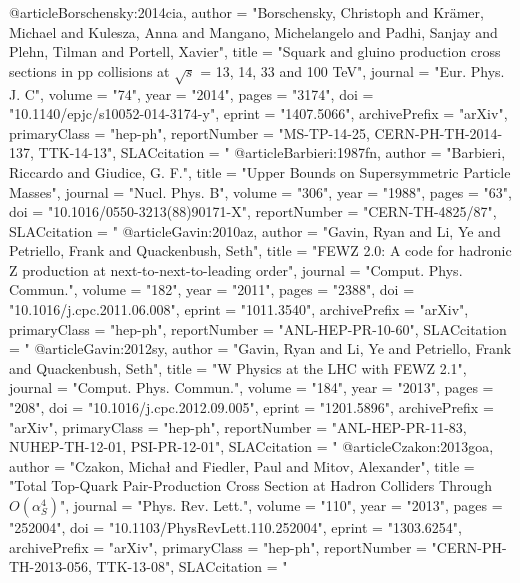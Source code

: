 @article{Borschensky:2014cia,
      author         = "Borschensky, Christoph and Kr{\"a}mer, Michael and Kulesza,
                        Anna and Mangano, Michelangelo and Padhi, Sanjay and
                        Plehn, Tilman and Portell, Xavier",
      title          = "{Squark and gluino production cross sections in pp
                        collisions at $\sqrt{s}$ = 13, 14, 33 and 100 TeV}",
      journal        = "Eur. Phys. J. C",
      volume         = "74",
      year           = "2014",
      pages          = "3174",
      doi            = "10.1140/epjc/s10052-014-3174-y",
      eprint         = "1407.5066",
      archivePrefix  = "arXiv",
      primaryClass   = "hep-ph",
      reportNumber   = "MS-TP-14-25, CERN-PH-TH-2014-137, TTK-14-13",
      SLACcitation   = "%
}
@article{Barbieri:1987fn,
      author         = "Barbieri, Riccardo and Giudice, G. F.",
      title          = "{Upper Bounds on Supersymmetric Particle Masses}",
      journal        = "Nucl. Phys. B",
      volume         = "306",
      year           = "1988",
      pages          = "63",
      doi            = "10.1016/0550-3213(88)90171-X",
      reportNumber   = "CERN-TH-4825/87",
      SLACcitation   = "%
}
@article{Gavin:2010az,
      author         = "Gavin, Ryan and Li, Ye and Petriello, Frank and
                        Quackenbush, Seth",
      title          = "{FEWZ 2.0: A code for hadronic Z production at
                        next-to-next-to-leading order}",
      journal        = "Comput. Phys. Commun.",
      volume         = "182",
      year           = "2011",
      pages          = "2388",
      doi            = "10.1016/j.cpc.2011.06.008",
      eprint         = "1011.3540",
      archivePrefix  = "arXiv",
      primaryClass   = "hep-ph",
      reportNumber   = "ANL-HEP-PR-10-60",
      SLACcitation   = "%
}
@article{Gavin:2012sy,
      author         = "Gavin, Ryan and Li, Ye and Petriello, Frank and
                        Quackenbush, Seth",
      title          = "{W Physics at the LHC with FEWZ 2.1}",
      journal        = "Comput. Phys. Commun.",
      volume         = "184",
      year           = "2013",
      pages          = "208",
      doi            = "10.1016/j.cpc.2012.09.005",
      eprint         = "1201.5896",
      archivePrefix  = "arXiv",
      primaryClass   = "hep-ph",
      reportNumber   = "ANL-HEP-PR-11-83, NUHEP-TH-12-01, PSI-PR-12-01",
      SLACcitation   = "%
}
@article{Czakon:2013goa,
      author         = "Czakon, Micha{\l} and Fiedler, Paul and Mitov, Alexander",
      title          = "{Total Top-Quark Pair-Production Cross Section at Hadron
                        Colliders Through $O(\alpha_S^4)$}",
      journal        = "Phys. Rev. Lett.",
      volume         = "110",
      year           = "2013",
      pages          = "252004",
      doi            = "10.1103/PhysRevLett.110.252004",
      eprint         = "1303.6254",
      archivePrefix  = "arXiv",
      primaryClass   = "hep-ph",
      reportNumber   = "CERN-PH-TH-2013-056, TTK-13-08",
      SLACcitation   = "%
}
